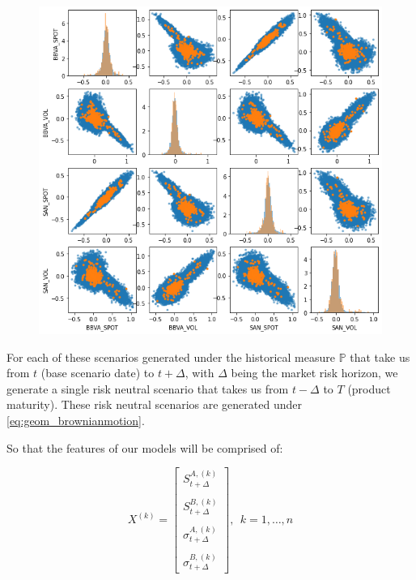 \begin{figure}[H] 
\centering
\includegraphics[width=1.0\textwidth]{Figures/MarketRisk/GaussMixture.png}
\caption{}
\label{fig:distrib_P_simul}
\end{figure}

For each of these scenarios generated under the historical measure $\mathbb{P}$ that take us from $t$ (base scenario date) to $t+\Delta$, with $\Delta$ being the market risk horizon, we generate a single risk neutral scenario that takes us from $t-\Delta$ to $T$ (product maturity). These risk neutral scenarios are generated under \ref{eq:geom_brownianmotion}. 

So that the features of our models will be comprised of:

$$
X^{(k)}=\left[\begin{array}{c}
S_{t+\Delta}^{A,(k)} \\ \\
S_{t+\Delta}^{B,(k)} \\ \\
\sigma_{t+\Delta}^{A,(k)} \\ \\
\sigma_{t+\Delta}^{B,(k)}
\end{array}\right], \ \  k=1, \ldots, n
$$

